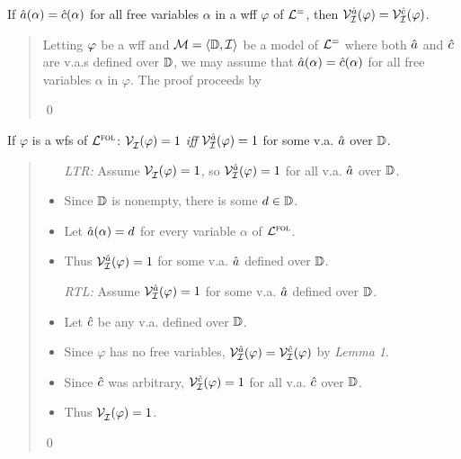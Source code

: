 \vspace{.05in}
\begin{Lthm} \label{VarAgree}
  If $\hat{a}(\alpha)=\hat{c}(\alpha)$ for all free variables $\alpha$ in a wff $\varphi$ of $\mathcal{L}^{=}$, then $\mathcal{V}_{\mathcal{I}}^{\hat{a}}(\varphi)=\mathcal{V}_{\mathcal{I}}^{\hat{c}}(\varphi)$.
\end{Lthm}

\begin{quote}
  Letting $\varphi$ be a wff and $\mathcal{M} = \langle\mathbb{D}, \mathcal{I}\rangle$ be a model of $\mathcal{L}^{=}$ where both $\hat{a}$ and $\hat{c}$ are v.a.s defined over $\mathbb{D}$, we may assume that $\hat{a}(\alpha)=\hat{c}(\alpha)$ for all free variables $\alpha$ in $\varphi$.
  The proof proceeds by 

  \qed
\end{quote}



\vspace{.05in}
\begin{Lthm} \label{VarAssign}
  If $\varphi$ is a wfs of $\mathcal{L}^{\textsc{fol}}$: $\mathcal{V}_{\mathcal{I}}^{}(\varphi)= 1$ \textit{iff} $\mathcal{V}_{\mathcal{I}}^{\hat{a}}(\varphi)= 1$ for some v.a. $\hat{a}$ over $\mathbb{D}$.
\end{Lthm}

\begin{quote}
  
    \begin{itemize}
      \item[\it LTR:] Assume $\mathcal{V}_{\mathcal{I}}^{}(\varphi)= 1$, so $\mathcal{V}_{\mathcal{I}}^{\hat{a}}(\varphi)= 1$ for all v.a. $\hat{a}$ over $\mathbb{D}$.
      \item Since $\mathbb{D}$ is nonempty, there is some $d \in \mathbb{D}$.
      \item Let $\hat{a}(\alpha) = d$ for every variable $\alpha$ of $\mathcal{L}^{\textsc{fol}}$.
      \item Thus $\mathcal{V}_{\mathcal{I}}^{\hat{a}}(\varphi)= 1$ for some v.a. $\hat{a}$ defined over $\mathbb{D}$.
      \item[\it RTL:] Assume $\mathcal{V}_{\mathcal{I}}^{\hat{a}}(\varphi)=1$ for some v.a. $\hat{a}$ defined over $\mathbb{D}$.
      \item Let $\hat{c}$ be any v.a. defined over $\mathbb{D}$.
      \item Since $\varphi$ has no free variables, $\mathcal{V}_{\mathcal{I}}^{\hat{a}}(\varphi)=\mathcal{V}_{\mathcal{I}}^{\hat{c}}(\varphi)$ by \textit{Lemma 1}.
      \item Since $\hat{c}$ was arbitrary, $\mathcal{V}_{\mathcal{I}}^{\hat{c}}(\varphi)=1$ for all v.a. $\hat{c}$ over $\mathbb{D}$.
      \item Thus $\mathcal{V}_{\mathcal{I}}^{}(\varphi)=1$.
    \end{itemize}

  \qed
\end{quote}


